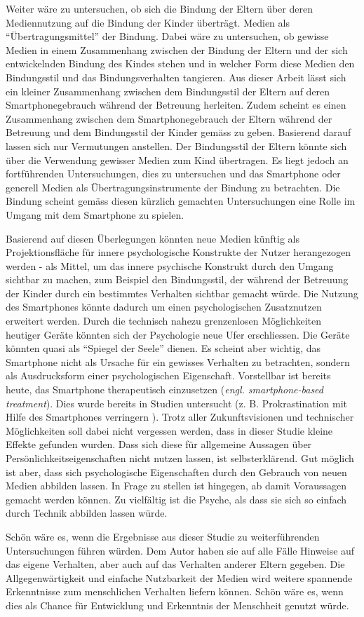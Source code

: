 Weiter wäre zu untersuchen, ob sich die Bindung der Eltern über deren Mediennutzung auf die Bindung der Kinder überträgt. Medien als \enquote{Übertragungsmittel} der Bindung. Dabei wäre zu untersuchen, ob gewisse Medien in einem Zusammenhang zwischen der Bindung der Eltern und der sich entwickelnden Bindung des Kindes stehen und in welcher Form diese Medien den Bindungsstil und das Bindungsverhalten tangieren. Aus dieser Arbeit lässt sich ein kleiner Zusammenhang zwischen dem Bindungsstil der Eltern auf deren Smartphonegebrauch während der Betreuung herleiten. Zudem scheint es einen Zusammenhang zwischen dem Smartphonegebrauch der Eltern während der Betreuung und dem Bindungsstil der Kinder gemäss  zu geben. Basierend darauf lassen sich nur Vermutungen anstellen. Der Bindungsstil der Eltern könnte sich über die Verwendung gewisser Medien zum Kind übertragen. Es liegt jedoch an fortführenden Untersuchungen, dies zu untersuchen und das Smartphone oder generell Medien als Übertragungsinstrumente der Bindung zu betrachten. Die Bindung scheint gemäss diesen kürzlich gemachten Untersuchungen eine Rolle im Umgang mit dem Smartphone zu spielen.

Basierend auf diesen Überlegungen könnten neue Medien künftig als Projektionsfläche für innere psychologische Konstrukte der Nutzer herangezogen werden - als Mittel, um das innere psychische Konstrukt durch den Umgang sichtbar zu machen, zum Beispiel den Bindungsstil, der während der Betreuung der Kinder durch ein bestimmtes Verhalten sichtbar gemacht würde. Die Nutzung des Smartphones könnte dadurch um einen psychologischen Zusatznutzen erweitert werden. Durch die technisch nahezu grenzenlosen Möglichkeiten heutiger Geräte könnten sich der Psychologie neue Ufer erschliessen. Die Geräte könnten quasi als \enquote{Spiegel der Seele} dienen. Es scheint aber wichtig, das Smartphone nicht als Ursache für ein gewisses Verhalten zu betrachten, sondern als Ausdrucksform einer psychologischen Eigenschaft. Vorstellbar ist bereits heute, das Smartphone therapeutisch einzusetzen (\textit{engl. smartphone-based treatment}). Dies wurde bereits in Studien untersucht (z. B. Prokrastination mit Hilfe des Smartphones verringern \cite{Lukas2018}). Trotz aller Zukunftsvisionen und technischer Möglichkeiten soll dabei nicht vergessen werden, dass in dieser Studie kleine Effekte gefunden wurden. Dass sich diese für allgemeine Aussagen über Persönlichkeitseigenschaften nicht nutzen lassen, ist selbsterklärend. Gut möglich ist aber, dass sich psychologische Eigenschaften durch den Gebrauch von neuen Medien abbilden lassen. In Frage zu stellen ist hingegen, ab damit Voraussagen gemacht werden können. Zu vielfältig ist die Psyche, als dass sie sich so einfach durch Technik abbilden lassen würde.  

Schön wäre es, wenn die Ergebnisse aus dieser Studie zu weiterführenden Untersuchungen führen würden. Dem Autor haben sie auf alle Fälle Hinweise auf das eigene Verhalten, aber auch auf das Verhalten anderer Eltern gegeben. Die Allgegenwärtigkeit und einfache Nutzbarkeit der Medien wird weitere spannende Erkenntnisse zum menschlichen Verhalten liefern können. Schön wäre es, wenn dies als Chance für Entwicklung und Erkenntnis der Menschheit genutzt würde.

\newpage